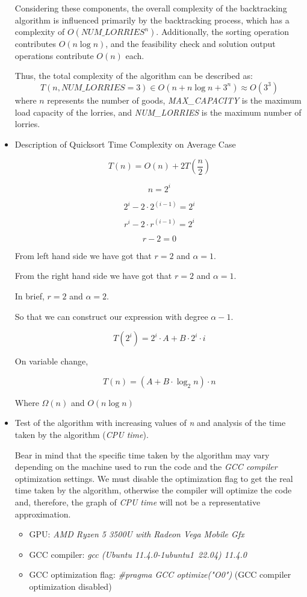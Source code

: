 \documentclass{article}
\begin{document}
\begin{itemize}
	      Considering these components, the overall complexity of the backtracking algorithm is influenced primarily by the backtracking process, which has a complexity of \(O(\textit{NUM\_LORRIES}^n)\). Additionally, the sorting operation contributes \(O(n \log n)\), and the feasibility check and solution output operations contribute \(O(n)\) each.

	      Thus, the total complexity of the algorithm can be described as:
	      \[
		      T(n, \textit{NUM\_LORRIES} = 3) \in O(n + n \log n + 3^n) \approx O(3^3)
	      \]
	      where \(n\) represents the number of goods, \textit{MAX\_CAPACITY} is the maximum load capacity of the lorries, and \textit{NUM\_LORRIES} is the maximum number of lorries.
\item{Description of Quicksort Time Complexity on Average Case}

\[
T(n)=O(n)+2T\left(\frac{n}{2}\right)
\]

\[
n=2^i
\]

\[
2^i-2\cdot2^{(i-1)}=2^i
\]

\[
r^i-2\cdot r^{(i-1)}=2^i
\]

\[
r-2=0
\]

From left hand side we have got that \(r=2\) and \(\alpha=1\).

From the right hand side we have got that \(r=2\) and \(\alpha=1\).

In brief, \(r=2\) and \(\alpha=2\).

So that we can construct our expression with degree \(\alpha-1\).

\[
T(2^i)=2^i \cdot A+B \cdot 2^i \cdot i
\]

On variable change,

\[
T(n)=(A+B \cdot \log_2 n)\cdot n
\]

Where \(\Omega(n)\) and \(O(n\log n)\)


	\item Test of the algorithm with increasing values of \textit{n} and analysis of the time taken by the algorithm (\textit{CPU time}).

	      Bear in mind that the specific time taken by the algorithm may vary depending on the machine used to run the code
	      and the \textit{GCC compiler} optimization settings. We must disable the optimization flag to get the real time taken by the algorithm,
	      otherwise the compiler will optimize the code and, therefore, the graph of \textit{CPU time} will not be a representative approximation.
	      \begin{itemize}
		      \item GPU: \textit{AMD Ryzen 5 3500U with Radeon Vega Mobile Gfx}
		      \item GCC compiler: \textit{gcc (Ubuntu 11.4.0-1ubuntu1~22.04) 11.4.0}
		      \item GCC optimization flag: \textit{\#pragma GCC optimize("O0")} (GCC compiler optimization disabled)
	      \end{itemize}


\end{itemize}
\end{document}
